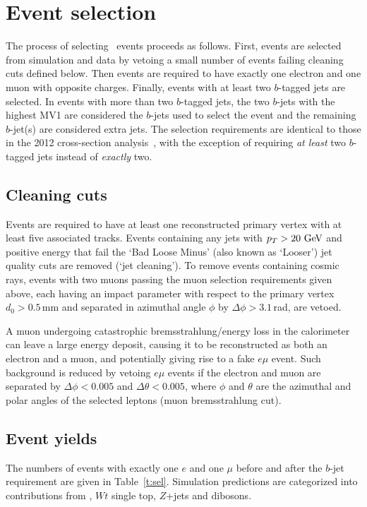 \section{Event selection}
The process of selecting \emubb\ events proceeds as follows. First, events are selected from simulation and data by vetoing a small number of events failing cleaning cuts defined below. Then events are required to have exactly one electron and one muon with opposite charges. Finally, events with at least two $b$-tagged jets are selected. In events with more than two $b$-tagged jets, the two $b$-jets with the highest MV1 are considered the $b$-jets used to select the event and the remaining $b$-jet(s) are considered extra jets. The selection requirements are identical to those in the 2012 \ttbar cross-section analysis~\cite{xsec}, with the exception of requiring \textit{at least} two $b$-tagged jets instead of \textit{exactly} two.

\subsection{Cleaning cuts}

Events are required to have at least one reconstructed primary vertex with at least five associated tracks. Events containing any jets with $p_T>20\GeV$ and positive energy that fail the `Bad Loose Minus' (also known as  `Looser') jet quality cuts \cite{jetcleaning} are removed (`jet cleaning'). To remove events containing cosmic rays, events with two muons passing the muon selection requirements given above, each having an impact parameter with respect to the primary vertex $d_0>0.5$\,mm and separated in azimuthal angle $\phi$ by $\Delta\phi>3.1$\,rad, are vetoed.

A muon undergoing catastrophic bremsstrahlung/energy loss in the calorimeter
can leave a large energy deposit, causing it to be reconstructed as both
an electron and a muon, and potentially giving rise to a fake $e\mu$ event.  Such background is reduced by vetoing $e\mu$ events if the electron and muon are separated by $\Delta\phi<0.005$ and $\Delta\theta<0.005$, where $\phi$ and $\theta$ are the azimuthal and polar angles of the selected leptons
(muon bremsstrahlung cut).

\subsection{Event yields}

The numbers of events with exactly one $e$ and one $\mu$ before and after the $b$-jet requirement are given in Table~\ref{t:sel}. Simulation predictions are categorized into contributions from \ttbar, $Wt$ single top, $Z$+jets and dibosons. 

